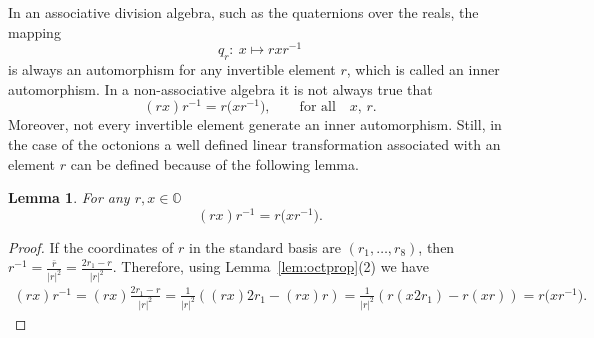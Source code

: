 \documentclass[10pt,a4paper]{amsart}
\numberwithin{equation}{section}
\newtheorem{Lemma}[Theorem]{Lemma}
\newcommand{\SO}{\mathbb{O}} %
\begin{document}
In an associative division algebra, such as the quaternions over the reals, the mapping
\[ q_r\colon \ x\mapsto rxr^{-1} \]
is always an automorphism for any invertible element $r$, which is called an inner automorphism. In a non-associative algebra it is not always true that
\[(rx)r^{-1}=r\big(xr^{-1}\big), \qquad \textrm{for all} \quad x,\,r.\]
Moreover, not every invertible element generate an inner automorphism. Still, in the case of the octonions a well defined linear transformation associated with an element $r$ can be defined because of the following lemma.
\begin{Lemma} \label{lem:innautass} For any $r,x \in \SO$
 \[(rx)r^{-1}=r\big(xr^{-1}\big).\]
\end{Lemma}
\begin{proof}If the coordinates of $r$ in the standard basis are $(r_1,\dots,r_8)$, then $r^{-1}=\frac{\bar{r}}{|r|^2}=\frac{2r_1-r}{|r|^2}$. Therefore, using Lemma~\ref{lem:octprop}(2) we have
 \begin{gather*} (rx)r^{-1} =(rx)\frac{2r_1-r}{|r|^2}=\frac{1}{|r|^2}( (rx)2r_1-(rx)r )= \frac{1}{|r|^2}( r(x2r_1)-r(xr) )= r\big(xr^{-1}\big).\tag*{\qed} \end{gather*}
\renewcommand{\qed}{}
\end{proof}
\end{document}
